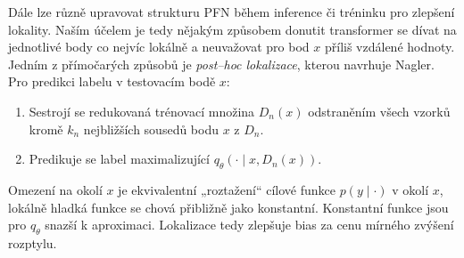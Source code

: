Dále lze různě upravovat strukturu PFN během inference či tréninku pro zlepšení lokality.
Naším účelem je tedy nějakým způsobem donutit transformer se dívat na jednotlivé body co nejvíc lokálně a neuvažovat pro bod $x$ příliš vzdálené hodnoty.
Jedním z přímočarých způsobů je \textit{post–hoc lokalizace}, kterou navrhuje Nagler.
Pro predikci labelu v testovacím bodě $x$:
\begin{enumerate}
    \item Sestrojí se redukovaná trénovací množina $D_n(x)$ odstraněním všech vzorků kromě $k_n$ nejbližších sousedů bodu $x$ z $D_n$.
    \item Predikuje se label maximalizující $q_\theta(\cdot \mid x, D_n(x))$.
\end{enumerate}

Omezení na okolí $x$ je ekvivalentní „roztažení“ cílové funkce $p(y \mid \cdot)$ v okolí $x$, lokálně hladká funkce se chová přibližně jako konstantní. 
Konstantní funkce jsou pro $q_\theta$ snazší k aproximaci. 
Lokalizace tedy zlepšuje bias za cenu mírného zvýšení rozptylu.
